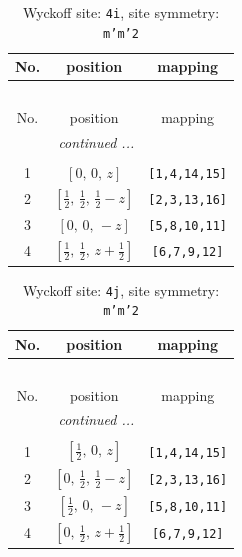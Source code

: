 \documentclass[fleqn,8pt]{jsarticle}
\begin{document}
\renewcommand{\arraystretch}{1.2}
\begin{longtable}{ccc}
\caption{Wyckoff site: {\tt 4i}, site symmetry: {\tt m'm'2}}
 \\
 \hline \hline
No. & position & mapping \\ \hline \endfirsthead

\multicolumn{2}{l}{\tablename\ \thetable{}} \\
 \hline \hline
No. & position & mapping \\ \hline \endhead

 \hline \hline
\multicolumn{2}{r}{\footnotesize\it continued ...} \\ \endfoot

 \hline \hline
\multicolumn{2}{r}{} \\ \endlastfoot

1 & $\left[ 0,\, 0,\, z \right]$ & {\tt [1,4,14,15]} \\ \hline
2 & $\left[ \frac{1}{2},\, \frac{1}{2},\, \frac{1}{2} - z \right]$ & {\tt [2,3,13,16]} \\ \hline
3 & $\left[ 0,\, 0,\, - z \right]$ & {\tt [5,8,10,11]} \\ \hline
4 & $\left[ \frac{1}{2},\, \frac{1}{2},\, z + \frac{1}{2} \right]$ & {\tt [6,7,9,12]} \\
\end{longtable}
\renewcommand{\arraystretch}{1.2}
\begin{longtable}{ccc}
\caption{Wyckoff site: {\tt 4j}, site symmetry: {\tt m'm'2}}
 \\
 \hline \hline
No. & position & mapping \\ \hline \endfirsthead

\multicolumn{2}{l}{\tablename\ \thetable{}} \\
 \hline \hline
No. & position & mapping \\ \hline \endhead

 \hline \hline
\multicolumn{2}{r}{\footnotesize\it continued ...} \\ \endfoot

 \hline \hline
\multicolumn{2}{r}{} \\ \endlastfoot

1 & $\left[ \frac{1}{2},\, 0,\, z \right]$ & {\tt [1,4,14,15]} \\ \hline
2 & $\left[ 0,\, \frac{1}{2},\, \frac{1}{2} - z \right]$ & {\tt [2,3,13,16]} \\ \hline
3 & $\left[ \frac{1}{2},\, 0,\, - z \right]$ & {\tt [5,8,10,11]} \\ \hline
4 & $\left[ 0,\, \frac{1}{2},\, z + \frac{1}{2} \right]$ & {\tt [6,7,9,12]} \\
\end{longtable}
\end{document}
